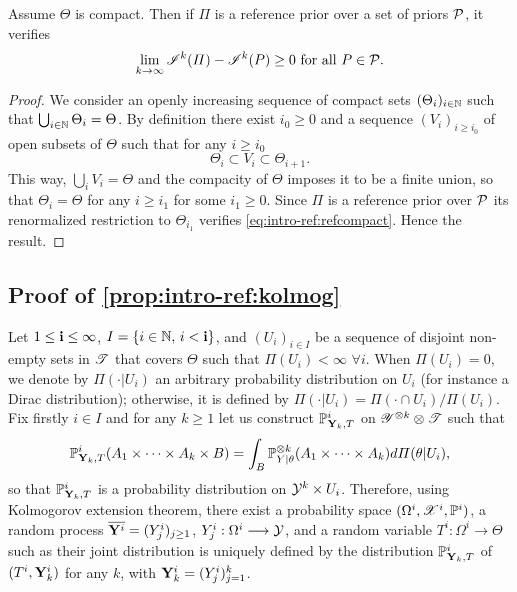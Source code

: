 \begin{prop}
    Assume $\Theta$ is compact. Then if $\varPi$ is a reference prior over a set of priors $\mathcal{P}$, it verifies
        \begin{equation}\label{eq:intro-ref:refcompact}
            \lim_{k\rightarrow\infty} \mathscr{I}^k(\varPi)-\mathscr{I}^k(P) \geq0\text{\ for all\ } P\in\mathcal{P}.
        \end{equation}
\end{prop}


\begin{proof} 
We consider an openly increasing sequence of compact sets $(\Theta_i)_{i\in\mathbb{N}}$ such that $\bigcup_{i\in\mathbb{N}}\Theta_i = \Theta$.
By definition there exist $i_0\geq0$ and a sequence $(V_i)_{i\geq i_0}$ of open subsets of $\Theta$  such that for any $i\geq i_0$
    \begin{equation}
        \Theta_i\subset V_i\subset \Theta_{i+1}.
    \end{equation}
This way, $\bigcup_iV_i=\Theta$ and the compacity of $\Theta$ imposes it to  be a finite union, so that $\Theta_i=\Theta$ for any $i\geq i_1$ for some $i_1\geq0$.
Since $\varPi$ is a reference prior over $\mathcal{P}$ its renormalized restriction to $\Theta_{i_1}$ verifies \cref{eq:intro-ref:refcompact}. Hence the result.
\end{proof}


\subsection{Proof of \cref{prop:intro-ref:kolmog}}\label{sec:intro-ref:proof}



Let $1\leq\mathbf{i}\leq\infty$, $I=\{i\in\mathbb{N},\,i<\mathbf{i}\}$, and $(U_i)_{i\in I}$ be a sequence of disjoint non-empty sets in $\mathscr{T}$ that covers $\Theta$ such that $\varPi(U_i)<\infty$ $\forall i$.
When $\varPi(U_i)=0$, we denote by $\varPi(\cdot|U_i)$ an arbitrary probability distribution on $U_i$ (for instance a Dirac distribution); otherwise, it is defined by $\varPi(\cdot|U_i)=\varPi(\cdot\cap U_i)/\varPi(U_i)$.
    Fix firstly $i\in I$ and for any $k\geq1$ let us construct $\mathbb{P}_{\mathbf{Y}_k,T}^i$ on $\mathscr{Y}^{\otimes k}\otimes\mathscr{T}$ such that
        \begin{equation}
            \mathbb{P}_{\mathbf{Y}_k,T}^i(A_1\times\dots\times A_k\times B) = \int_B \mathbb{P}_{Y|\theta}^{\otimes k}(A_1\times\dots\times A_k)d\varPi(\theta|U_i),
        \end{equation}
     so that $\mathbb{P}^i_{\mathbf{Y}_k,T}$ is a probability distribution on $\mathcal{Y}^k\times U_i$. 
    Therefore, using Kolmogorov extension theorem, there exist a probability space $(\Omega^i,\mathscr{X}^i,\mathbb{P}^i)$, a random process $\overline{\mathbf{Y}^i}=(Y^i_j)_{j\geq1}$, $Y_j^i:\Omega^i\longrightarrow\mathcal{Y}$, and a random variable $T^i:\Omega^i\to\Theta$ such as  their joint distribution is uniquely defined by the distribution
    $\mathbb{P}^i_{\mathbf{Y}_k,T}$ of $(T^i,\mathbf{Y}_k^i)$ for any $k$, with $\mathbf{Y}_k^i=(Y_j^i)_{j=1}^k$.



